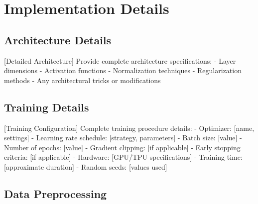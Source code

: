 \section{Implementation Details}
\label{app:implementation}

\subsection{Architecture Details}
\label{app:architecture}

[Detailed Architecture] Provide complete architecture specifications:
- Layer dimensions
- Activation functions
- Normalization techniques
- Regularization methods
- Any architectural tricks or modifications


\subsection{Training Details}
\label{app:training}

[Training Configuration] Complete training procedure details:
- Optimizer: [name, settings]
- Learning rate schedule: [strategy, parameters]
- Batch size: [value]
- Number of epochs: [value]
- Gradient clipping: [if applicable]
- Early stopping criteria: [if applicable]
- Hardware: [GPU/TPU specifications]
- Training time: [approximate duration]
- Random seeds: [values used]

\subsection{Data Preprocessing}
\label{app:preprocessing}

